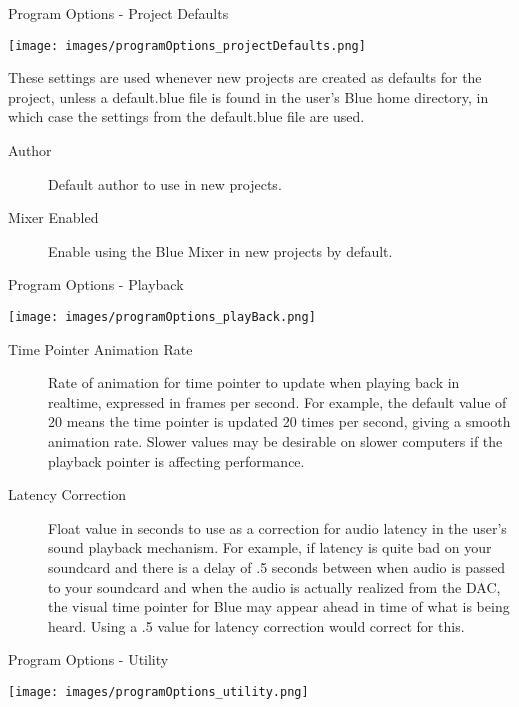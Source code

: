 Program Options - Project Defaults

\texttt{[image: images/programOptions\_projectDefaults.png]}

These settings are used whenever new projects are created as defaults
for the project, unless a default.blue file is found in the user's Blue
home directory, in which case the settings from the default.blue file
are used.

\begin{description}
\item[Author]
Default author to use in new projects.
\item[Mixer Enabled]
Enable using the Blue Mixer in new projects by default.
\end{description}

Program Options - Playback

\texttt{[image: images/programOptions\_playBack.png]}

\begin{description}
\item[Time Pointer Animation Rate]
Rate of animation for time pointer to update when playing back in
realtime, expressed in frames per second. For example, the default value
of 20 means the time pointer is updated 20 times per second, giving a
smooth animation rate. Slower values may be desirable on slower
computers if the playback pointer is affecting performance.
\item[Latency Correction]
Float value in seconds to use as a correction for audio latency in the
user's sound playback mechanism. For example, if latency is quite bad on
your soundcard and there is a delay of .5 seconds between when audio is
passed to your soundcard and when the audio is actually realized from
the DAC, the visual time pointer for Blue may appear ahead in time of
what is being heard. Using a .5 value for latency correction would
correct for this.
\end{description}

Program Options - Utility

\texttt{[image: images/programOptions\_utility.png]}

